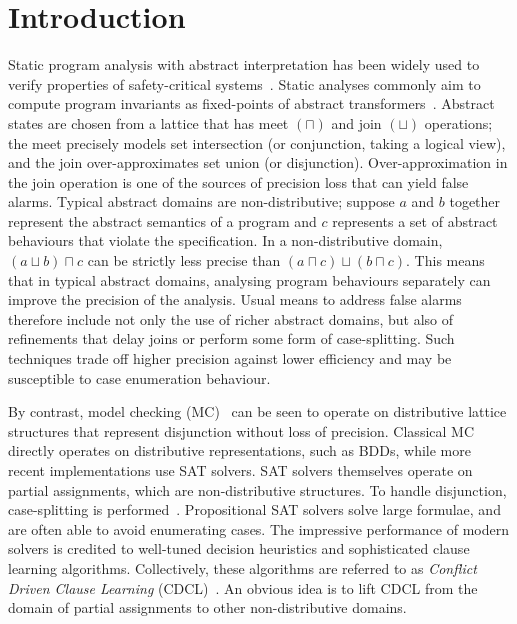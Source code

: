 \section{Introduction}

%
Static program analysis with abstract interpretation has been widely used to
verify properties of safety-critical systems~\cite{CC77,
DBLP:conf/pldi/BlanchetCCFMMMR03}.  Static analyses commonly aim to compute
program invariants as fixed-points of abstract transformers~\cite{se2011}. 
Abstract states are chosen from a lattice that has meet $(\sqcap)$ and join
$(\sqcup)$ operations; the meet precisely models set intersection (or
conjunction, taking a logical view), and the join over-approximates set
union (or disjunction).  Over-approximation in the join operation is one of
the sources of precision loss that can yield false alarms.  Typical abstract
domains are non-distributive; suppose $a$ and $b$ together represent the
abstract semantics of a program and $c$ represents a set of abstract
behaviours that violate the specification.  In a non-distributive domain,
$(a \sqcup b) \sqcap c$ can be strictly less precise than $(a \sqcap c)
\sqcup (b \sqcap c)$.  This means that in typical abstract domains,
analysing program behaviours separately can improve the precision of the
analysis.  Usual means to address false alarms therefore include not only
the use of richer abstract domains, but also of refinements that delay joins
or perform some form of case-splitting.  Such techniques trade off higher
precision against lower efficiency and may be susceptible to case
enumeration behaviour.

By contrast, model checking (MC)~\cite{mc-book} can be seen to operate on
distributive lattice structures that represent disjunction without loss
of precision.  Classical MC directly operates on distributive
representations, such as BDDs, while more recent implementations use SAT
solvers.  SAT solvers themselves operate on partial assignments, which are
non-distributive structures.  To handle disjunction, case-splitting is
performed~\cite{sas12}.  Propositional SAT solvers solve large formulae, and
are often able to avoid enumerating cases.  The impressive performance of
modern solvers is credited to well-tuned decision heuristics and
sophisticated clause learning algorithms.  Collectively, these algorithms
are referred to as \emph{Conflict Driven Clause Learning}
(CDCL)~\cite{cdcl}.  An obvious idea is to lift CDCL from the
domain of partial assignments to other
non-distributive domains.

